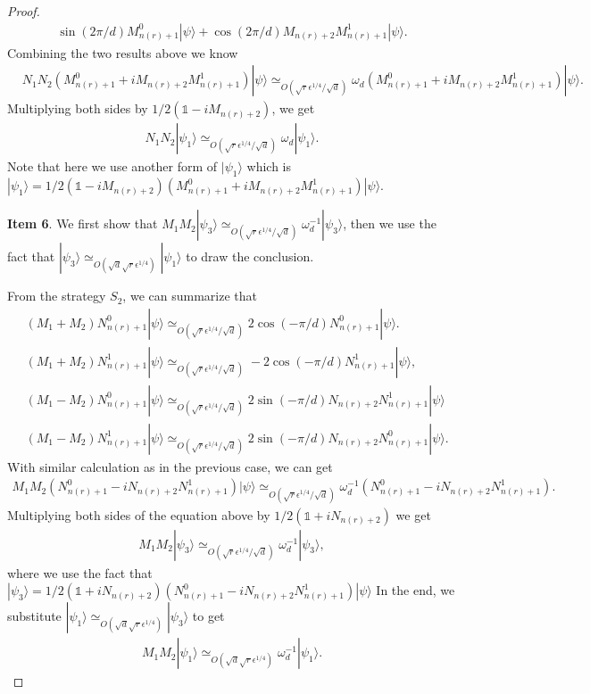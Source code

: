 \documentclass[11pt,letterpaper]{article}
\newcommand{\ket}[1]{|#1\rangle}
\newcommand{\1}{\mathbb{1}}
\newcommand{\nr}{n(r)}
\newcommand{\qe}{\epsilon^{1/4}}
\newcommand{\sd}{\sqrt{d}}
\newcommand{\sr}{\sqrt{r}}
\newcommand{\appd}[1]{\simeq_{#1}}
\theoremstyle{definition}
\begin{document}
\begin{proof}
\begin{align}
		\sin(2\pi/d) M_{\nr+1}^0\ket{\psi} + \cos(2\pi/d)M_{\nr+2}M_{\nr+1}^1\ket{\psi}.
        \end{align}
        Combining the two results above we know
	\begin{align}
		\label{eq:omegad}
		&N_1N_2 (M_{\nr+1}^0 + i M_{\nr+2}M_{\nr+1}^1) \ket{\psi} 
		\appd{O(\sr \qe/\sd)}\omega_d(M_{\nr+1}^0 + iM_{\nr+2}M_{\nr+1}^1) \ket{\psi}.
	\end{align}
	Multiplying both sides by $1/2(\1 - iM_{\nr+2})$, we get
	\begin{align}
		N_1N_2 \ket{\psi_1} \appd{O(\sr \qe/\sd)} \omega_d\ket{\psi_1}.
	\end{align}
	Note that here we use another form of $\ket{\psi_1}$ which is 
	$\ket{\psi_1} = 1/2(\1 - iM_{\nr+2})(M_{\nr+1}^0 + i M_{\nr+2}M_{\nr+1}^1) \ket{\psi}$.
	
	\textbf{Item 6}.
	We first show that $M_1M_2 \ket{\psi_3}\appd{O(\sr \qe/\sd)} \omega_d^{-1} \ket{\psi_3}$, then we 
	use the fact that $\ket{\psi_3} \appd{O(\sd \sr\qe)} \ket{\psi_1}$ to draw the conclusion.
	
	From the strategy $S_2$, we can summarize that 
	\begin{align}
		&(M_1+M_2) N_{\nr+1}^0 \ket{\psi} \appd{O(\sr \qe/\sd)} 2 \cos(-\pi/d)N_{\nr+1}^0 \ket{\psi}.\\
		&(M_1+M_2) N_{\nr+1}^1 \ket{\psi}  \appd{O(\sr \qe/\sd)} -2 \cos(-\pi/d)N_{\nr+1}^1 \ket{\psi},\\
		&(M_1-M_2) N_{\nr+1}^0\ket{\psi} \appd{O(\sr\qe/\sd)}2 \sin(-\pi/d)N_{\nr+2} N_{\nr+1}^1\ket{\psi}\\
		&(M_1 -M_2)N_{\nr+1}^1 \ket{\psi} \appd{O(\sr\qe/\sd)} 2 \sin(-\pi/d)N_{\nr+2} N_{\nr+1}^0 \ket{\psi}.
	\end{align}
	With similar calculation as in the previous case, we can get 
	\begin{align}
		M_1M_2 (N_{\nr+1}^0 - i N_{\nr+2}N_{\nr+1}^1) \ket{\psi} \appd{O(\sr \qe/\sd)} \omega_d^{-1} (N_{\nr+1}^0 - i N_{\nr+2}N_{\nr+1}^1).
	\end{align}
	Multiplying both sides of the equation above by $1/2(\1+iN_{\nr+2})$ we get
	\begin{align}
		M_1M_2 \ket{\psi_3} \appd{O(\sr \qe/\sd)} \omega_d^{-1}\ket{\psi_3},
	\end{align}
	where we use the fact that $\ket{\psi_3} = 1/2(\1+iN_{\nr+2})(N_{\nr+1}^0 - i N_{\nr+2}N_{\nr+1}^1) \ket{\psi}$
	In the end, we substitute $\ket{\psi_1}  \appd{O(\sd \sr\qe)} \ket{\psi_3}$ to get
	\begin{align}
		M_1M_2 \ket{\psi_1} \appd{O(\sd \sr \qe)} \omega_d^{-1}\ket{\psi_1}.
	\end{align}
\end{proof}
\end{document}
